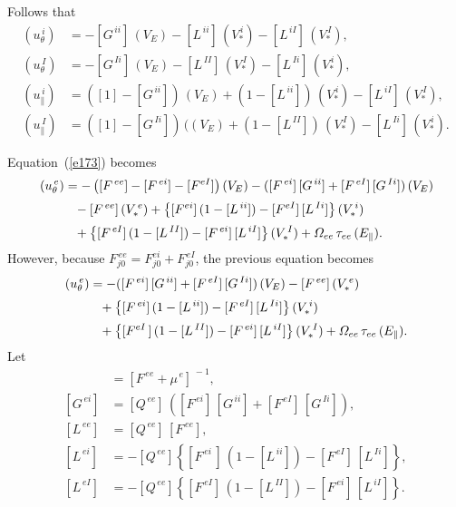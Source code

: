 \documentclass[notitlepage,12pt]{article}
\begin{document}
Follows that
\begin{align}
(u_\theta^{\,i}) &= -[G^{\,ii}]\,(V_E)-[L^{\,ii}]\,(V_\ast^{\,i})-[L^{\,iI}]\,(V_\ast^{\,I}),\\[0.5ex]
(u_\theta^{\,I}) &= -[G^{\,Ii}]\,(V_E)- [L^{\,II}]\,(V_\ast^{\,I}) - [L^{\,Ii}]\,(V_\ast^{\,i}),\\[0.5ex]
(u_\parallel^{\,i}) &= ([1]-[G^{\,ii}])\,(V_E) + (1-[L^{\,ii}])\,(V_\ast^{\,i}) -[L^{\,iI}]\,(V_\ast^{\,I}),\\[0.5ex]
(u_\parallel^{\,I}) &= ([1]-[G^{\,Ii}])\,((V_E) + (1-[L^{\,II}])\,(V_\ast^{\,I}) -[L^{\,Ii}]\,(V_\ast^{\,i}).
\end{align}

Equation~(\ref{e173}) becomes 
\begin{align}
[F^{\,ee}+\mu^{\,e}]\,(u_\theta^{\,e})& = -\left([F^{\,ee}]-[F^{\,ei}]-[F^{eI}]\right)(V_E)-([F^{\,ei}]\,[G^{\,ii}]+ [F^{\,eI}]\,[G^{\,Ii}])\,(V_E)\nonumber\\[0.5ex]&
\phantom{=}-[F^{\,ee}]\,(V_\ast^{\,e})+ \left\{[F^{ei}]\,(1-[L^{\,ii}])-[F^{eI}]\,[L^{\,Ii}]\right\}(V_\ast^{\,i})\nonumber\\[0.5ex]
&\phantom{=}
+ \left\{[F^{\,eI}]\,(1-[L^{\,II}])-[F^{\,ei}]\,[L^{\,iI}]\right\}(V_\ast^{\,I})+{\mit\Omega}_{ee}\,\tau_{ee}\,(E_\parallel).
\end{align}
However, because $F^{\,ee}_{j0}=F^{ei}_{j0}+F^{\,eI}_{j0}$, the previous equation becomes
\begin{align}
[F^{\,ee}+\mu^{\,e}]\,(u_\theta^{\,e})& =-([F^{\,ei}]\,[G^{\,ii}]+ [F^{\,eI}]\,[G^{\,Ii}])\,(V_E)-[F^{\,ee}]\,(V_\ast^{\,e})\nonumber\\[0.5ex]
&\phantom{=}
+ \left\{[F^{\,ei}]\,(1-[L^{\,ii}])-[F^{\,eI}]\,[L^{\,Ii}]\right\}(V_\ast^{\,i})\nonumber\\[0.5ex]
&\phantom{=}
+ \left\{[F^{eI}\,]\,(1-[L^{\,II}])-[F^{\,ei}]\,[L^{\,iI}]\right\}(V_\ast^{\,I})+{\mit\Omega}_{ee}\,\tau_{ee}\,(E_\parallel).
\end{align}
Let
\begin{align}
[Q^{\,ee}] &= [F^{\,ee}+\mu^{\,e}]^{\,-1},\\[0.5ex]
[G^{\,ei}] &= [Q^{\,ee}]\,([F^{\,ei}]\,[G^{\,ii}]+ [F^{\,eI}]\,[G^{\,Ii}]),\\[0.5ex]
[L^{\,ee}] &= [Q^{\,ee}]\,[F^{\,ee}],\\[0.5ex]
[L^{\,ei}] &= -[Q^{\,ee}]\left\{[F^{\,ei}\,]\,(1-[L^{\,ii}])-[F^{\,eI}]\,[L^{\,Ii}]\right\},\\[0.5ex]
[L^{\,eI}] &= -[Q^{\,ee}]\left\{[F^{\,eI}]\,(1-[L^{\,II}])-[F^{\,ei}]\,[L^{\,iI}]\right\}.
\end{align}
\end{document}
